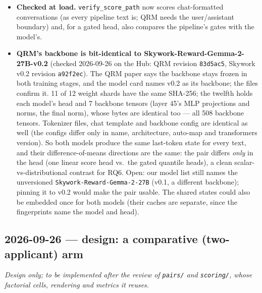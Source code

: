 \documentclass{article}
\begin{document}
\begin{itemize}
        prompt --- whose disparities run through $h$ alone; baseline $-$ \texttt{gate\_fixed} is the gate's part. This
        is the RQ3 question ``where does the demographic information live'' for QRM. The geometry uses the mean
        effective head, so its \texttt{did\_from\_states} is approximate for QRM.
  \item \textbf{Checked at load.} \texttt{verify\_score\_path} now scores chat-formatted conversations (as every
        pipeline text is; QRM needs the user/assistant boundary) and, for a gated head, also compares the
        pipeline's gates with the model's.
  \item \textbf{QRM's backbone is bit-identical to Skywork-Reward-Gemma-2-27B-v0.2} (checked 2026-09-26 on the
        Hub: QRM revision \texttt{83d5ac5}, Skywork v0.2 revision \texttt{a92f2ec}). The QRM paper says the backbone
        stays frozen in both training stages, and the model card names v0.2 as its backbone; the files confirm it.
        11 of 12 weight shards have the same SHA-256; the twelfth holds each model's head and 7 backbone tensors
        (layer 45's MLP projections and norms, the final norm), whose bytes are identical too --- all 508 backbone
        tensors. Tokenizer files, chat template and backbone config are identical as well (the configs differ only
        in name, architecture, auto-map and transformers version). So both models produce the same last-token
        state for every text, and their difference-of-means directions are the same: the pair differs \emph{only}
        in the head (one linear score head vs.\ the gated quantile heads), a clean scalar-vs-distributional
        contrast for RQ6. Open: our model list still names the unversioned \texttt{Skywork-Reward-Gemma-2-27B}
        (v0.1, a different backbone); pinning it to v0.2 would make the pair usable. The shared states could also
        be embedded once for both models (their caches are separate, since the fingerprints name the model and
        head).
\end{itemize}

\subsection*{2026-09-26 --- design: a comparative (two-applicant) arm}
\emph{Design only; to be implemented after the review of \texttt{pairs/} and \texttt{scoring/}, whose factorial
cells, rendering and metrics it reuses.}
\end{document}
